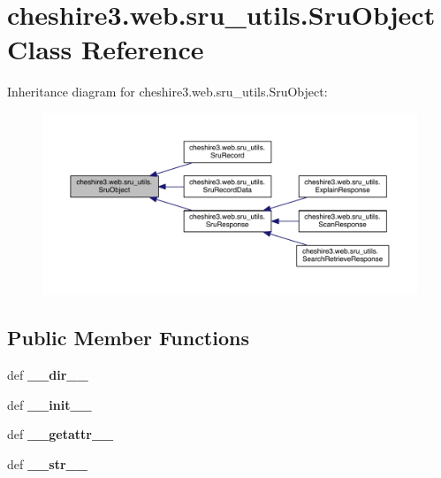\hypertarget{classcheshire3_1_1web_1_1sru__utils_1_1_sru_object}{\section{cheshire3.\-web.\-sru\-\_\-utils.\-Sru\-Object Class Reference}
\label{classcheshire3_1_1web_1_1sru__utils_1_1_sru_object}
}


Inheritance diagram for cheshire3.\-web.\-sru\-\_\-utils.\-Sru\-Object\-:
\nopagebreak
\begin{figure}[H]
\begin{center}
\leavevmode
\includegraphics[width=350pt]{classcheshire3_1_1web_1_1sru__utils_1_1_sru_object__inherit__graph}
\end{center}
\end{figure}
\subsection*{Public Member Functions}
\begin{DoxyCompactItemize}
\item 
\hypertarget{classcheshire3_1_1web_1_1sru__utils_1_1_sru_object_a44e2c9de7f26f9786f16ce672bbf47d1}{def {\bfseries \-\_\-\-\_\-dir\-\_\-\-\_\-}}\label{classcheshire3_1_1web_1_1sru__utils_1_1_sru_object_a44e2c9de7f26f9786f16ce672bbf47d1}

\item 
\hypertarget{classcheshire3_1_1web_1_1sru__utils_1_1_sru_object_ac0e029c6ba7a35a8de77a47f3d8dbd79}{def {\bfseries \-\_\-\-\_\-init\-\_\-\-\_\-}}\label{classcheshire3_1_1web_1_1sru__utils_1_1_sru_object_ac0e029c6ba7a35a8de77a47f3d8dbd79}

\item 
\hypertarget{classcheshire3_1_1web_1_1sru__utils_1_1_sru_object_aa1effa229faf29600e6a865aa8e89c2f}{def {\bfseries \-\_\-\-\_\-getattr\-\_\-\-\_\-}}\label{classcheshire3_1_1web_1_1sru__utils_1_1_sru_object_aa1effa229faf29600e6a865aa8e89c2f}

\item 
\hypertarget{classcheshire3_1_1web_1_1sru__utils_1_1_sru_object_af9cb585b81bcad045a9f9f62282413dc}{def {\bfseries \-\_\-\-\_\-str\-\_\-\-\_\-}}\label{classcheshire3_1_1web_1_1sru__utils_1_1_sru_object_af9cb585b81bcad045a9f9f62282413dc}

\end{DoxyCompactItemize}
